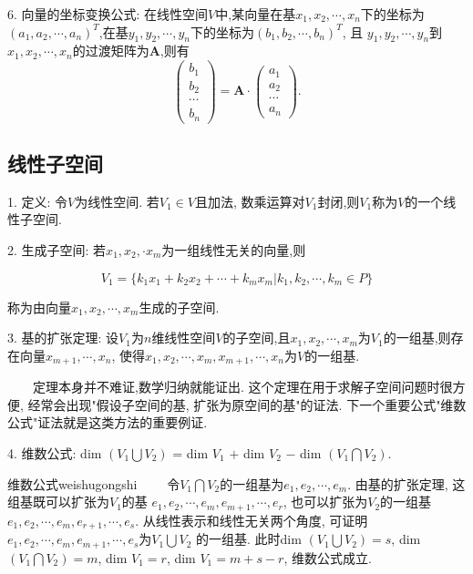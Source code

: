 6. 向量的坐标变换公式: 在线性空间$V$中,某向量在基$x_1,x_2,\cdots,x_n$下的坐标为$(a_1,a_2,\cdots,a_n)^T$,在基$y_1,y_2,\cdots,y_n$下的坐标为$(b_1,b_2,\cdots,b_n)^T$, 且
$y_1,y_2,\cdots,y_n$到$x_1,x_2,\cdots,x_n$的过渡矩阵为\textbf{A},则有
\begin{equation*}
    \begin{pmatrix}
        b_1\\
        b_2\\
        \cdots\\
        b_n
    \end{pmatrix}=\textbf{A}\cdot
    \begin{pmatrix}
        a_1\\
        a_2\\
        \cdots\\
        a_n
    \end{pmatrix}.
\end{equation*}

\subsection{线性子空间}

1. 定义: 令$V$为线性空间. 若$V_1 \in V$且加法, 数乘运算对$V_1$封闭,则$V_1$称为$V$的一个线性子空间.

2. 生成子空间: 若$x_1,x_2,\cdot x_m$为一组线性无关的向量,则

$$V_1=\{k_1x_1+k_2x_2+\cdots+k_mx_m|k_1,k_2,\cdots,k_m \in P\}$$

称为由向量$x_1,x_2,\cdots,x_m$生成的子空间.

3. 基的扩张定理: 设$V_1$为$n$维线性空间$V$的子空间,且$x_1,x_2,\cdots,x_m$为$V_1$的一组基,则存在向量$x_{m+1},\cdots,x_n$, 
使得$x_1,x_2,\cdots,x_m,x_{m+1},\cdots,x_n$为$V$的一组基.

\begin{tcolorbox}[colback=gray!5,colframe=orange!75!black,title=注意事项]
    ~~~~定理本身并不难证,数学归纳就能证出. 这个定理在用于求解子空间问题时很方便, 经常会出现"假设子空间的基, 扩张为原空间的基"的证法. 
    下一个重要公式"维数公式"证法就是这类方法的重要例证.
  \end{tcolorbox}

4. 维数公式: dim $(V_1 \bigcup V_2)$ = dim $V_1$ $+$ dim $V_2$ $-$ dim $(V_1 \bigcap V_2)$.

\begin{coro}{维数公式}{weishugongshi}
~~~~令$V_1 \bigcap V_2$的一组基为$e_1,e_2,\cdots,e_m$. 由基的扩张定理, 这组基既可以扩张为$V_1$的基
$e_1,e_2,\cdots,e_m,e_{m+1},\cdots,e_r$, 也可以扩张为$V_2$的一组基$e_1,e_2,\cdots,e_m,e_{r+1},\cdots,e_s$. 
从线性表示和线性无关两个角度, 可证明$e_1,e_2,\cdots,e_m,e_{m+1},\cdots,e_s$为$V_1 \bigcup V_2$ 的一组基. 
此时dim $(V_1 \bigcup V_2) = s$, dim $(V_1 \bigcap V_2) = m$, dim $V_1 = r$, dim $V_1 = m+s-r$, 维数公式成立. 
\end{coro}

